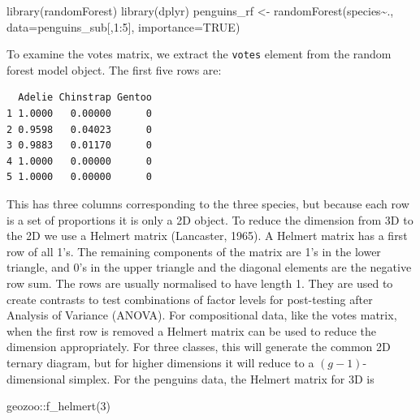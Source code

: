 \documentclass[
  letterpaper,
]{krantz}
\newenvironment{Shaded}{\begin{snugshade}}{\end{snugshade}}
\newcommand{\AttributeTok}[1]{\textcolor[rgb]{0.40,0.45,0.13}{#1}}
\newcommand{\ConstantTok}[1]{\textcolor[rgb]{0.56,0.35,0.01}{#1}}
\newcommand{\DecValTok}[1]{\textcolor[rgb]{0.68,0.00,0.00}{#1}}
\newcommand{\FunctionTok}[1]{\textcolor[rgb]{0.28,0.35,0.67}{#1}}
\newcommand{\NormalTok}[1]{\textcolor[rgb]{0.00,0.23,0.31}{#1}}
\newcommand{\OtherTok}[1]{\textcolor[rgb]{0.00,0.23,0.31}{#1}}
\newcommand{\SpecialCharTok}[1]{\textcolor[rgb]{0.37,0.37,0.37}{#1}}
\begin{document}
\begin{Shaded}
\begin{Highlighting}[]
\FunctionTok{library}\NormalTok{(randomForest)}
\FunctionTok{library}\NormalTok{(dplyr)}
\NormalTok{penguins\_rf }\OtherTok{\textless{}{-}} \FunctionTok{randomForest}\NormalTok{(species}\SpecialCharTok{\textasciitilde{}}\NormalTok{.,}
                             \AttributeTok{data=}\NormalTok{penguins\_sub[,}\DecValTok{1}\SpecialCharTok{:}\DecValTok{5}\NormalTok{],}
                             \AttributeTok{importance=}\ConstantTok{TRUE}\NormalTok{)}
\end{Highlighting}
\end{Shaded}

To examine the votes matrix, we extract the \texttt{votes} element from
the random forest model object. The first five rows are:

\begin{Shaded}
\end{Shaded}

\begin{verbatim}
  Adelie Chinstrap Gentoo
1 1.0000   0.00000      0
2 0.9598   0.04023      0
3 0.9883   0.01170      0
4 1.0000   0.00000      0
5 1.0000   0.00000      0
\end{verbatim}

This has three columns corresponding to the three species, but because
each row is a set of proportions it is only a 2D object. To reduce the
dimension from 3D to the 2D we use a Helmert matrix (Lancaster, 1965). A
Helmert matrix has a first row of all 1's. The remaining components of
the matrix are 1's in the lower triangle, and 0's in the upper triangle
and the diagonal elements are the negative row sum. The rows are usually
normalised to have length 1. They are used to create contrasts to test
combinations of factor levels for post-testing after Analysis of
Variance (ANOVA). For compositional data, like the votes matrix, when
the first row is removed a Helmert matrix can be used to reduce the
dimension appropriately. For three classes, this will generate the
common 2D ternary diagram, but for higher dimensions it will reduce to a
\((g-1)\)-dimensional simplex. For the penguins data, the Helmert matrix
for 3D is 

\begin{Shaded}
\begin{Highlighting}[]
\NormalTok{geozoo}\SpecialCharTok{::}\FunctionTok{f\_helmert}\NormalTok{(}\DecValTok{3}\NormalTok{)}
\end{Highlighting}
\end{Shaded}
\end{document}
